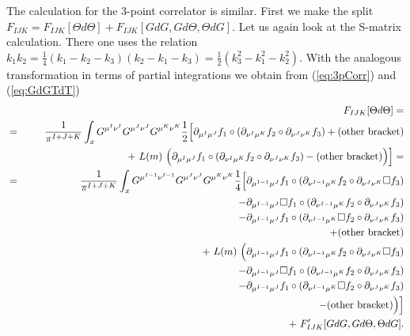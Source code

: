 \documentclass[a4paper,11pt]{article}               \def\new#1\endnew{{\bf #1}}
\begin{document}
The calculation for the 3-point correlator is similar. First we make the
split $F_{IJK}=F_{IJK}[\Theta d\Theta] + F_{IJK}[GdG,Gd\Theta,\Theta dG]$.
Let us again look at the S-matrix calculation. There one uses the relation
$k_1 k_2 = \frac 14 (k_1-k_2-k_3)(k_2-k_1-k_3)=\frac 12(k_3^2 -k_1^2 -k_2^2)$.
With the analogous transformation in terms of partial integrations we obtain
from (\ref{eq:3pCorr}) and (\ref{eq:GdGTdT})
\begin{eqnarray}
  \label{eq:intpart3}
  &&F_{IJK}[\Theta d\Theta] =
\\ 
  &=&\frac 1{\pi^{I+J+K}} 
    \int _x G^{\mu^I\nu^I}G^{\mu^J\nu^J}G^{\mu^K\nu^K}
      \frac 12 \Bigl[ \partial_{\mu^I\mu^J}f_1 \circ 
      (\partial_{\nu^I\mu^K}f_2 \circ \partial_{\nu^J\nu^K}f_3) +
      (\textrm{other bracket})
\nonumber\\
  && \hspace*{3.5truecm}+~L(m)~\Bigl(\partial_{\mu^I\mu^J}f_1\circ 
                 (\partial_{\nu^I\mu^K}f_2\circ \partial_{\nu^J\nu^K}f_3) -
                 (\textrm{other bracket})
  \Bigr) \Bigr] =
\nonumber\\
  &=&\frac 1{\pi^{I+J+K}} 
    \int _x G^{\mu^{I-1}\nu^{I-1}}G^{\mu^J\nu^J}G^{\mu^K\nu^K}
      \frac 14 \Bigl[ 
      \partial_{\mu^{I-1}\mu^J}f_1 \circ 
      (\partial_{\nu^{I-1}\mu^K}f_2 \circ \partial_{\nu^J\nu^K}\square f_3)
\nonumber\\
  &&  \hspace*{6truecm}
      -\partial_{\mu^{I-1}\mu^J}\square f_1 \circ 
      (\partial_{\nu^{I-1}\mu^K}f_2 \circ \partial_{\nu^J\nu^K}f_3)
\nonumber\\
  &&  \hspace*{6truecm}
      -\partial_{\mu^{I-1}\mu^J}f_1 \circ 
      (\partial_{\nu^{I-1}\mu^K}\square f_2 \circ \partial_{\nu^J\nu^K}f_3)
\nonumber\\      
  &&  \hspace*{6truecm}
      +(\textrm{other bracket})
\nonumber\\
  && \hspace*{3.5truecm}+~L(m)~\Bigl(
      \partial_{\mu^{I-1}\mu^J}f_1\circ 
      (\partial_{\nu^{I-1}\mu^K}f_2\circ \partial_{\nu^J\nu^K}\square f_3)
\nonumber\\
  &&  \hspace*{5truecm}
      -\partial_{\mu^{I-1}\mu^J}\square f_1 \circ 
      (\partial_{\nu^{I-1}\mu^K}f_2 \circ \partial_{\nu^J\nu^K}f_3)
\nonumber\\
  &&  \hspace*{5truecm}
      -\partial_{\mu^{I-1}\mu^J}f_1 \circ 
      (\partial_{\nu^{I-1}\mu^K}\square f_2 \circ \partial_{\nu^J\nu^K}f_3)
\nonumber\\      
  &&  \hspace*{5truecm}
      -(\textrm{other bracket})
  \Bigr) \Bigr]
\nonumber\\
  && \hspace*{0.5truecm} +~F'_{IJK}[GdG,Gd\Theta,\Theta dG].
\nonumber
\end{eqnarray}
\end{document}
